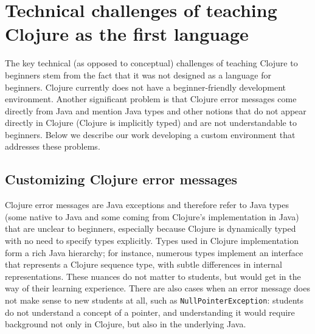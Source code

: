 \documentclass[submission,copyright,creativecommons]{eptcs}
\newcommand{\allcomments}[1]{{#1}}
\newcommand{\elenacomment}[1]{{\bf \textcolor{ForestGreen}{\allcomments{{#1}}}}}
\newcommand{\stephencomment}[1]{{\bf \color{StephensBlue}{\allcomments{{#1}}}}} %
\newcommand{\joecomment}[1]{{\bf \color{JoesGold}{\allcomments{{#1}}}}}
\newcommand{\todo}[1]{{\bf \color{magenta}{\allcomments{ To-do: {#1}}}}}
\begin{document}

\section{Technical challenges of teaching Clojure as the first language}\label{sec:technical}
The key technical (as opposed to conceptual) challenges of teaching Clojure to beginners stem from the fact that it was not designed as a language for beginners. Clojure currently does not have a beginner-friendly development environment. Another significant problem is that Clojure error messages come directly from Java and mention Java types and other notions %
that do not appear directly in Clojure (Clojure is implicitly typed) and are not understandable to beginners. 
Below we describe our work developing a custom environment that addresses these problems.

\subsection{Customizing Clojure error messages}\label{subsec:errors}

Clojure error messages are Java exceptions and therefore refer to Java types (some native to Java and some coming from Clojure's implementation in Java) that are unclear to beginners, especially because Clojure is dynamically typed with no need  to specify types explicitly. 
Types used in Clojure implementation form a rich Java hierarchy; for instance, numerous types implement an interface that represents a Clojure sequence type, with subtle differences in internal representations.   
These nuances do not matter to students, but would get in the way of their learning experience. There are also cases when an error message does not make sense to new students at all, such as {\tt NullPointerException}: students do not understand a concept of a pointer, and understanding it would require background  not only in Clojure, but also in the underlying Java. 
\end{document}
